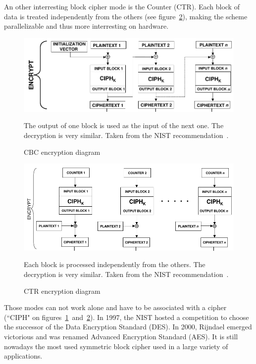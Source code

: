\indent An other interresting block cipher mode is the Counter (CTR).
Each block of data is treated independently from the others (see figure~\ref{fig:ctr-encrypt}), making the scheme parallelizable and thus more interresting on hardware.

\begin{figure}
\includegraphics[width=\textwidth]{nist-cbc}
\caption{CBC encryption diagram}{The output of one block is used as the input of the next one. The decryption is very similar. Taken from the NIST recommendation~\cite{nist-sp800-38A}.}
\label{fig:cbc-encrypt}
\end{figure}

\begin{figure}
\includegraphics[width=\textwidth]{nist-ctr}
\caption{CTR encryption diagram}{Each block is processed independently from the others. The decryption is very similar. Taken from the NIST recommendation~\cite{nist-sp800-38A}.}
\label{fig:ctr-encrypt}
\end{figure}

Those modes can not work alone and have to be associated with a cipher (``CIPH" on figures~\ref{fig:cbc-encrypt}~and~\ref{fig:ctr-encrypt}).
In 1997, the NIST hosted a competition to choose the successor of the Data Encryption Standard (DES).
In 2000, Rijndael emerged victorious and was renamed Advanced Encryption Standard (AES).
It is still nowadays the most used symmetric block cipher used in a large variety of applications.\newline{}

